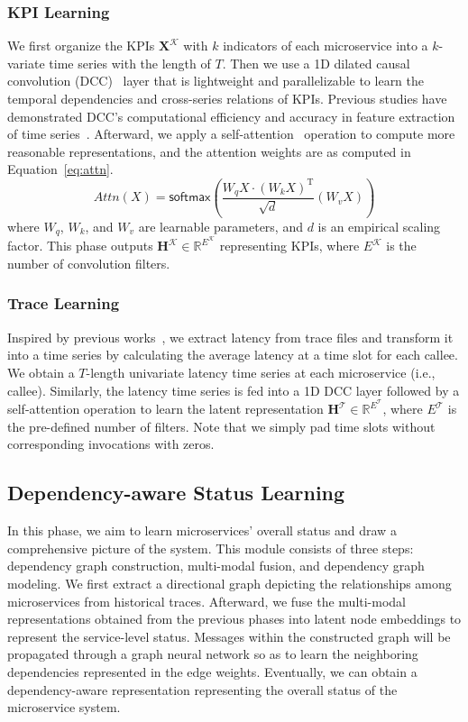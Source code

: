\subsubsection{KPI Learning}\label{sec:method:KPI}
We first organize the KPIs $\mathbf{X}^\mathcal{K}$ with $k$ indicators of each microservice into a $k$-variate time series with the length of $T$.
Then we use a 1D dilated causal convolution (DCC)~\cite{TCN} layer that is lightweight and parallelizable to learn the temporal dependencies and cross-series relations of KPIs. 
Previous studies have demonstrated DCC's computational efficiency and accuracy in feature extraction of time series~\cite{TCNexp}.
Afterward, we apply a self-attention~\cite{Attn} operation to compute more reasonable representations, and the attention weights are as computed in Equation~\ref{eq:attn}.
\begin{equation}\label{eq:attn}
    Attn(X) = \mathsf{softmax} \left( \frac{W_qX \cdot (W_kX)^{\mathrm{T}}}{\sqrt{d}}(W_vX) \right) 
\end{equation}
where $W_q$, $W_k$, and $W_v$ are learnable parameters, and $d$ is an empirical scaling factor.
This phase outputs $\boldsymbol{H}^\mathcal{K} \in \mathbb{R}^{E^\mathcal{K}}$ representing KPIs, where $E^\mathcal{K}$ is the number of convolution filters.

\subsubsection{Trace Learning}\label{sec:method:trace}
Inspired by previous works~\cite{AID, DyCause, TraceAnomaly}, we extract latency from trace files and transform it into a time series by calculating the average latency at a time slot for each callee. We obtain a $T$-length univariate latency time series at each microservice (i.e., callee).
Similarly, the latency time series is fed into a 1D DCC layer followed by a self-attention operation to learn the latent representation $\boldsymbol{H}^\mathcal{T} \in \mathbb{R}^{E^\mathcal{T}}$, where $E^\mathcal{T}$ is the pre-defined number of filters.
Note that we simply pad time slots without corresponding invocations with zeros.

\subsection{Dependency-aware Status Learning}\label{sec:method:2}
In this phase, we aim to learn microservices' overall status and draw a comprehensive picture of the system. This module consists of three steps: dependency graph construction, multi-modal fusion, and dependency graph modeling.
We first extract a directional graph depicting the relationships among microservices from historical traces. 
Afterward, we fuse the multi-modal representations obtained from the previous phases into latent node embeddings to represent the service-level status. Messages within the constructed graph will be propagated through a graph neural network so as to learn the neighboring dependencies represented in the edge weights. 
Eventually, we can obtain a dependency-aware representation representing the overall status of the microservice system.

